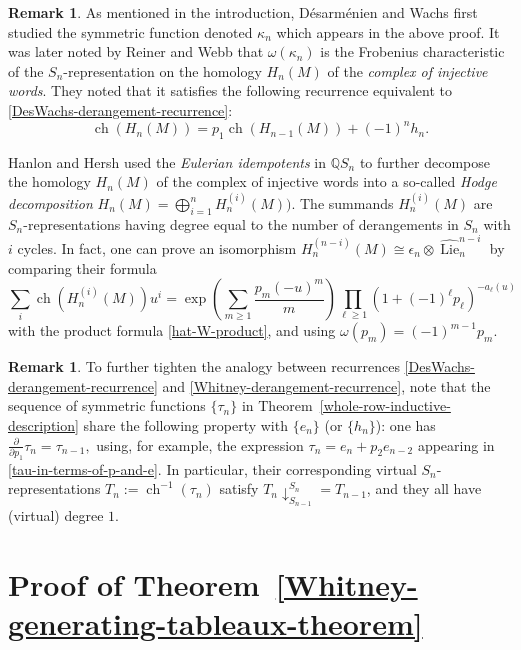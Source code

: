 \documentclass[12pt]{amsart}
\theoremstyle{plain}
\theoremstyle{definition}
\newtheorem{remark}[thm]{Remark}
\begin{document}
\begin{remark}
\label{first-other-derangement-remark}
As mentioned in the introduction, 
D\'esarm\'enien and Wachs \cite{DesarmenienWachs} first
studied the symmetric function denoted $\kappa_n$ which appears 
in the above proof.
It was later noted by Reiner and Webb \cite[Thm. 2.4]{WebbR}
that $\omega(\kappa_n)$ is the 
Frobenius characteristic of the $S_n$-representation
on the homology $H_n(M)$ of the {\it complex of injective words}.
They noted \cite[Prop. 2.2]{WebbR} that it satisfies 
the following 
recurrence equivalent to \eqref{DesWachs-derangement-recurrence}:
$$
{{\operatorname{ch}}}(H_n(M))=p_1 {{\operatorname{ch}}}(H_{n-1}(M))+(-1)^n h_n.
$$

Hanlon and Hersh \cite[Theorem 2.3]{Hanlon-Hersh2} used 
the {\it Eulerian idempotents} in ${{\mathbb Q}} S_n$ to further decompose
the homology $H_n(M)$ of the complex of injective words into a 
so-called {\it Hodge decomposition} 
$
H_n(M)=\bigoplus_{i=1}^n H_n^{(i)}(M)).
$
The summands $H_n^{(i)}(M)$ 
are $S_n$-representations having degree equal to the number of derangements 
in $S_n$ with $i$ cycles.  In fact, one can prove an isomorphism
$
H_n^{(n-i)}(M)
\cong 
\epsilon_n \otimes \widehat{{\operatorname{Lie}}}^{n-i}_n 
$
by comparing their formula \cite[bottom of p. 118]{Hanlon-Hersh2}  
$$
\sum_i {{\operatorname{ch}}}(H_n^{(i)}(M)) u^i 
 = \exp\left(\sum_{m \geq 1} \frac{p_m(-u)^m}{m} \right)
    \prod_{\ell \geq 1} (1+(-1)^\ell p_\ell)^{-a_\ell(u)}
$$
with the product formula \eqref{hat-W-product}, 
and using $\omega(p_m)=(-1)^{m-1} p_m$.
\end{remark}

\begin{remark}
To further tighten the analogy between recurrences 
\eqref{DesWachs-derangement-recurrence}
and 
\eqref{Whitney-derangement-recurrence},
note that the sequence of symmetric functions $\{\tau_n\}$ in 
Theorem~\ref{whole-row-inductive-description} share the following property
with $\{e_n\}$ (or $\{h_n\}$):  one has 
$
\frac{\partial}{\partial p_1} \tau_n = \tau_{n-1},
$
using, for example, the expression 
$
\tau_n = e_n + p_2 e_{n-2}
$
appearing in \eqref{tau-in-terms-of-p-and-e}.
In particular, their corresponding 
virtual $S_n$-representations $T_n:={{\operatorname{ch}}}^{-1}(\tau_n)$
satisfy $T_n\downarrow^{S_n}_{S_{n-1}} = T_{n-1}$, 
and they all have (virtual) degree $1$.
\end{remark}

\section{Proof of Theorem~\ref{Whitney-generating-tableaux-theorem}}
\label{Whitney-generating-section}
\end{document}
